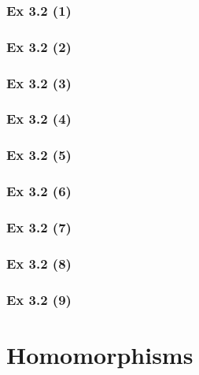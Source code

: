 \subsubsection{Ex 3.2 (1)}\label{sec:Ex_3.2.1}

\subsubsection{Ex 3.2 (2)}\label{sec:Ex_3.2.2}

\subsubsection{Ex 3.2 (3)}\label{sec:Ex_3.2.3}

\subsubsection{Ex 3.2 (4)}\label{sec:Ex_3.2.4}

\subsubsection{Ex 3.2 (5)}\label{sec:Ex_3.2.5}

\subsubsection{Ex 3.2 (6)}\label{sec:Ex_3.2.6}

\subsubsection{Ex 3.2 (7)}\label{sec:Ex_3.2.7}

\subsubsection{Ex 3.2 (8)}\label{sec:Ex_3.2.8}

\subsubsection{Ex 3.2 (9)}\label{sec:Ex_3.2.9}

\newpage		%

\section{Homomorphisms}\label{sec:3.3}
